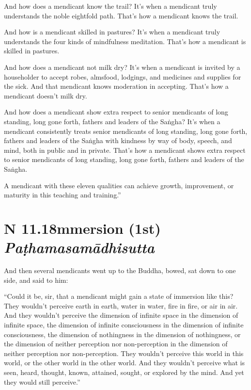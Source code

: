 \documentclass[12pt,openany]{book}%
\newcommand*{\suttatitleacronym}[1]{\smaller[2]{#1}\vspace*{.3em}}
\newcommand*{\suttatitletranslation}[1]{\linebreak{#1}}
\newcommand*{\suttatitleroot}[1]{\linebreak\smaller[2]\itshape{#1}}
\newcommand*{\tocacronym}[1]{\hspace*{-3.3em}{#1}\quad}
\newcommand*{\toctranslation}[1]{#1}
\newcommand*{\tocroot}[1]{(\textit{#1})}
\begin{document}
And how does a mendicant know the trail? It’s when a mendicant truly understands the noble eightfold path. That’s how a mendicant knows the trail. 

And how is a mendicant skilled in pastures? It’s when a mendicant truly understands the four kinds of mindfulness meditation. That’s how a mendicant is skilled in pastures. 

And how does a mendicant not milk dry? It’s when a mendicant is invited by a householder to accept robes, almsfood, lodgings, and medicines and supplies for the sick. And that mendicant knows moderation in accepting. That’s how a mendicant doesn’t milk dry. 

And how does a mendicant show extra respect to senior mendicants of long standing, long gone forth, fathers and leaders of the \textsanskrit{Saṅgha}? It’s when a mendicant consistently treats senior mendicants of long standing, long gone forth, fathers and leaders of the \textsanskrit{Saṅgha} with kindness by way of body, speech, and mind, both in public and in private. That’s how a mendicant shows extra respect to senior mendicants of long standing, long gone forth, fathers and leaders of the \textsanskrit{Saṅgha}. 

A mendicant with these eleven qualities can achieve growth, improvement, or maturity in this teaching and training.” 

%
\section*{{\suttatitleacronym AN 11.18}{\suttatitletranslation Immersion (1st) }{\suttatitleroot Paṭhamasamādhisutta}}
\addcontentsline{toc}{section}{\tocacronym{AN 11.18} \toctranslation{Immersion (1st) } \tocroot{Paṭhamasamādhisutta}}

And then several mendicants went up to the Buddha, bowed, sat down to one side, and said to him: 

“Could it be, sir, that a mendicant might gain a state of immersion like this? They wouldn’t perceive earth in earth, water in water, fire in fire, or air in air. And they wouldn’t perceive the dimension of infinite space in the dimension of infinite space, the dimension of infinite consciousness in the dimension of infinite consciousness, the dimension of nothingness in the dimension of nothingness, or the dimension of neither perception nor non-perception in the dimension of neither perception nor non-perception. They wouldn’t perceive this world in this world, or the other world in the other world. And they wouldn’t perceive what is seen, heard, thought, known, attained, sought, or explored by the mind. And yet they would still perceive.” 
\end{document}

